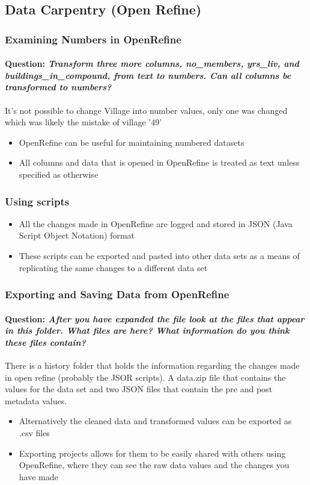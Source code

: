 \documentclass[12pt]{article}
\newcommand{\question}[1]{\paragraph{Question: {\textnormal{\textit{#1}}} ~\\}}
\begin{document}
\subsection{Data Carpentry (Open Refine)}
\subsubsection{Examining Numbers in OpenRefine}
\question{Transform three more columns, no\_members, yrs\_liv, and buildings\_in\_compound, from text to numbers. Can all columns be transformed to numbers?}
It's not possible to change Village into number values, only one was changed which was likely the mistake of village '49'
\begin{itemize}
    \item OpenRefine can be useful for maintaining numbered datasets
    \item All columns and data that is opened in OpenRefine is treated as text unless specified as otherwise
\end{itemize}
\subsubsection{Using scripts}
\begin{itemize}
    \item All the changes made in OpenRefine are logged and stored in JSON (Java Script Object Notation) format
    \item These scripts can be exported and pasted into other data sets as a means of replicating the same changes to a different data set
\end{itemize}
\subsubsection{Exporting and Saving Data from OpenRefine}
\question{After you have expanded the file look at the files that appear in this folder. What files are here? What information do you think these files contain?}
There is a history folder that holds the information regarding the changes made in open refine (probably the JSOR scripts). A data.zip file that contains the values for the data set and two JSON files that contain the pre and post metadata values.
\begin{itemize}
    \item Alternatively the cleaned data and transformed values can be exported as .csv files
    \item Exporting projects allows for them to be easily shared with others using OpenRefine, where they can see the raw data values and the changes you have made
\end{itemize}
\end{document}
